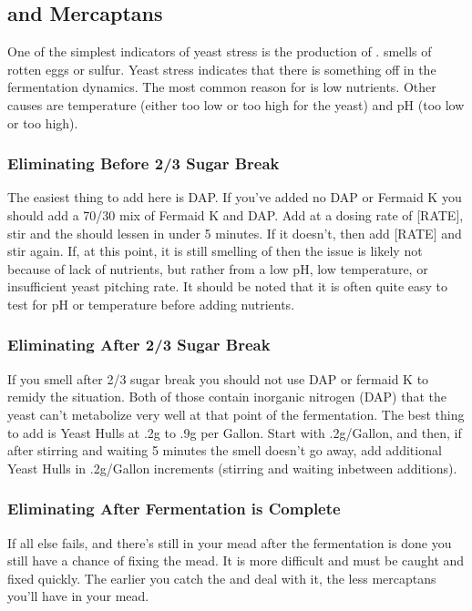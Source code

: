 \documentclass{article}
\begin{document}
 \subsection{ and Mercaptans}
  One of the simplest indicators of yeast stress is the production of .  smells of rotten eggs or sulfur. Yeast stress indicates that there is
  something off in the fermentation dynamics. The most common reason for  is low nutrients. Other causes are temperature (either too low or too high for 
  the yeast) and pH (too low or too high).

  \subsubsection{Eliminating Before 2/3 Sugar Break}
   The easiest thing to add here is DAP. If you've added no DAP or Fermaid K you should add a 70/30 mix of Fermaid K and DAP. Add at a dosing rate of [RATE], stir and the 
    should lessen in under 5 minutes. If it doesn't, then add [RATE] and stir again. If, at this point, it is still smelling of  then the issue is likely
   not because of lack of nutrients, but rather from a low pH, low temperature, or insufficient yeast pitching rate. It should be noted that it is often quite easy 
   to test for pH or temperature before adding nutrients.

  \subsubsection{Eliminating After 2/3 Sugar Break} 
   If you smell  after 2/3 sugar break you should not use DAP or fermaid K to remidy the situation. Both of those contain inorganic nitrogen (DAP) 
   that the yeast can't metabolize very well at that point of the fermentation. The best thing to add is Yeast Hulls at .2g to .9g per Gallon. Start with .2g/Gallon, and
   then, if after stirring and waiting 5 minutes the  smell doesn't go away, add additional Yeast Hulls in .2g/Gallon increments (stirring and waiting inbetween
   additions).

  \subsubsection{Eliminating After Fermentation is Complete}
   If all else fails, and there's still  in your mead after the fermentation is done you still have a chance of fixing the mead. It is more difficult and must 
   be caught and fixed quickly. The earlier you catch the  and deal with it, the less mercaptans you'll have in your mead. 
\end{document}
